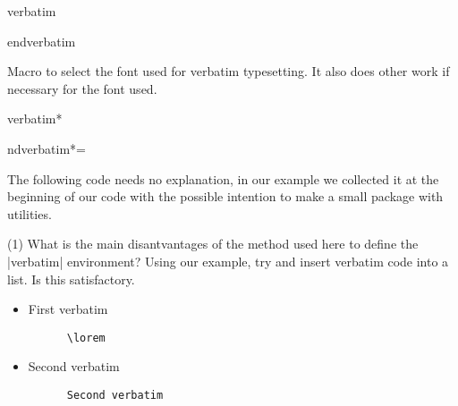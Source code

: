 \begin{docCommand}{verbatim}{}
\begin{docCommand}{endverbatim}{}
\begin{teX}
\def\verbatim{\@verbatim \frenchspacing\@vobeyspaces \@xverbatim}
\def\endverbatim{\if@newlist \leavevmode\fi\endtrivlist}
\end{teX}
\end{docCommand}
\end{docCommand}
%
\begin{macro}{\verbatim@font}
    Macro to select the font  used for verbatim typesetting.
    It also does other work if necessary for the font used.
\begin{teX}
\def\verbatim@font{\normalfont\ttfamily}
\end{teX}
\end{macro}


\begin{environment}{verbatim*}
\begin{teX}
\expandafter\let\csname endverbatim*\endcsname =\endverbatim
\end{teX}
\end{environment}

The following code needs no explanation, in our example we collected it at the beginning
of our code with the possible intention to make a small package with utilities.
\begin{macro}{\@makeother}
\begin{teX}
\def\@makeother#1{\catcode`#112\relax}
\end{teX}
\end{macro}

\begin{question}
\begin{tasks}(1)
 \task What is the main disantvantages of the method used here to define
       the |verbatim| environment?
 \task Using our example, try and insert verbatim code into a list. Is this satisfactory.
\end{tasks}
\end{question}


\begin{texexample}{}{}
\begin{itemize}
\item First verbatim
      \begin{verbatim}
      \lorem
      \end{verbatim}
\item Second verbatim
      \begin{verbatim}
      Second verbatim
       \end{verbatim}
\end{itemize}

\end{texexample}

